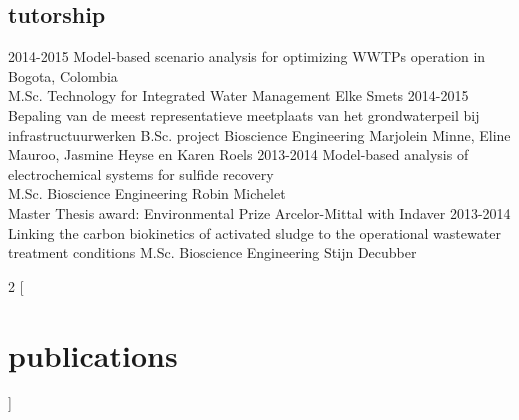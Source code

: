 \documentclass[]{stvhoey-cv}  %
\begin{document}
\subsection*{tutorship}
\begin{entrylist}
  \entry
    {2014-2015}
    {Model-based scenario analysis for optimizing WWTPs operation in Bogota, Colombia\\}
    {M.Sc. Technology for Integrated Water Management}
    {Elke Smets }
  \entry
    {2014-2015}
    {Bepaling van de meest representatieve meetplaats van het grondwaterpeil bij infrastructuurwerken}
    {B.Sc. project Bioscience Engineering}
    {Marjolein Minne, Eline Mauroo, Jasmine Heyse en Karen Roels}
   \entry
    {2013-2014}
    {Model-based analysis of electrochemical systems for sulfide recovery\\}
    {M.Sc. Bioscience Engineering}
    {Robin Michelet\\ \small{Master Thesis award: Environmental Prize Arcelor-Mittal with Indaver}}
   \entry
    {2013-2014}
    {Linking the carbon biokinetics of activated sludge to the operational wastewater treatment conditions}
    {M.Sc. Bioscience Engineering}
    {Stijn Decubber}
\end{entrylist}

\begin{multicols}{2}
[
\section{publications}
]

\phantom{publications} %
\vspace{-26pt}


\begin{refsection}
  \nocite{*}
  \printbibliography[sorting=chronological, type=inproceedings, title={peer-reviewed conferences/proceedings}, notkeyword={oral}, notkeyword={poster}, heading=subbibliography]
\end{refsection}

\begin{refsection}
  \nocite{*}
  \printbibliography[sorting=chronological, type=inproceedings, title={conference presentations}, keyword={oral}, heading=subbibliography]
\end{refsection}

\begin{refsection}
  \nocite{*}
  \printbibliography[sorting=chronological, type=inproceedings, title={conference posters}, keyword={poster}, heading=subbibliography]
\end{refsection}


\end{multicols}

\end{document}
